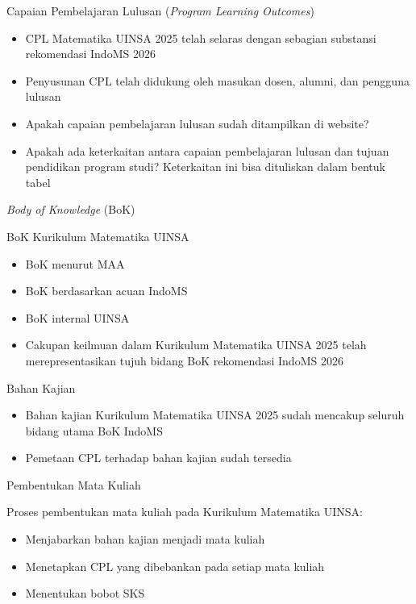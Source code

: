 \documentclass[aspectratio=169,11pt]{beamer}
\begin{document}
\begin{frame}{Capaian Pembelajaran Lulusan (\textit{Program Learning Outcomes})}

\begin{itemize}
\item CPL Matematika UINSA 2025 telah selaras dengan sebagian substansi rekomendasi IndoMS 2026
\item Penyusunan CPL telah didukung oleh masukan dosen, alumni, dan pengguna lulusan
\item Apakah capaian pembelajaran lulusan sudah ditampilkan di website?
\item Apakah ada keterkaitan antara capaian pembelajaran lulusan dan tujuan pendidikan program studi? Keterkaitan ini bisa dituliskan dalam bentuk tabel
\end{itemize}

\end{frame}

\begin{frame}{\textit{Body of Knowledge} (BoK)}

\begin{block}{BoK Kurikulum Matematika UINSA}
\begin{itemize}
\item BoK menurut MAA
\item BoK berdasarkan acuan IndoMS
\item BoK internal UINSA
\end{itemize}
\end{block}

\begin{itemize}
\item Cakupan keilmuan dalam Kurikulum Matematika UINSA 2025 telah merepresentasikan tujuh bidang BoK rekomendasi IndoMS 2026
\end{itemize}

\end{frame}

\begin{frame}{Bahan Kajian}

\begin{itemize}
\item Bahan kajian Kurikulum Matematika UINSA 2025 sudah mencakup seluruh bidang utama BoK IndoMS
\item Pemetaan CPL terhadap bahan kajian sudah tersedia
\end{itemize}

\end{frame}

\begin{frame}{Pembentukan Mata Kuliah}

Proses pembentukan mata kuliah pada Kurikulum Matematika UINSA:
\begin{itemize}
\item Menjabarkan bahan kajian menjadi mata kuliah
\item Menetapkan CPL yang dibebankan pada setiap mata kuliah
\item Menentukan bobot SKS
\end{itemize}

\end{frame}
\end{document}
